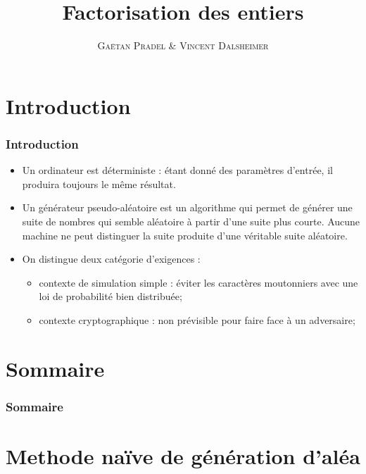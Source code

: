 \documentclass[utf8,10pt,french]{beamer}
\title[FdE]{Factorisation des entiers}
\author[GV]{\textsc{Gaëtan Pradel \& Vincent Dalsheimer}}
\institute{Université Bordeaux 1}
\begin{document}
\frame{\titlepage}

\section{Introduction}
\begin{frame}
  \frametitle{Introduction}
\begin{itemize}
\item Un ordinateur est déterministe : étant donné des paramètres d'entrée, il produira toujours le même résultat. \pause
\item Un générateur pseudo-aléatoire est un algorithme qui permet de générer une suite de nombres qui semble aléatoire à partir d'une suite plus courte. Aucune machine ne peut distinguer la suite produite d'une véritable suite aléatoire. \pause
\item On distingue deux catégorie d'exigences : 
\begin{itemize}
\item contexte de simulation simple : éviter les caractères moutonniers avec une loi de probabilité bien distribuée;
\item contexte cryptographique : non prévisible pour faire face à un adversaire;
\end{itemize}
\end{itemize}
\end{frame}

\section*{Sommaire}
\begin{frame}
  \frametitle{Sommaire}
  \tableofcontents
\end{frame}

\section{Methode naïve de génération d'aléa}
\end{document}
